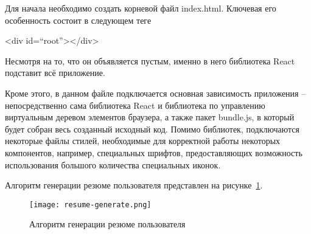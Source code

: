 Для начала необходимо создать корневой файл index.html. Ключевая его особенность состоит в следующем теге
\begin{flushleft}
\qquad\qquad\qquad\qquad\qquad <div id=``root''></div>
\end{flushleft}

Несмотря на то, что он объявляется пустым, именно в него библиотека React подставит всё приложение.

Кроме этого, в данном файле подключается основная зависимость приложения -- непосредственно сама библиотека React и
библиотека по управлению виртуальным деревом элементов браузера, а также пакет bun\-dle.js, в который будет собран весь
созданный исходный код. Помимо библиотек, подключаются некоторые файлы стилей, необходимые для корректной работы
некоторых компонентов, например, специальных шрифтов, предоставляющих возможность использования большого количества
специальных иконок.

Алгоритм генерации резюме пользователя представлен на рисунке~\ref{fig:design:client:ux:resume_generate}.

\begin{figure}[!h]
  \centering
    \texttt{[image: resume-generate.png]}
    \caption{Алгоритм генерации резюме пользователя}
    \label{fig:design:client:ux:resume_generate}
\end{figure}
